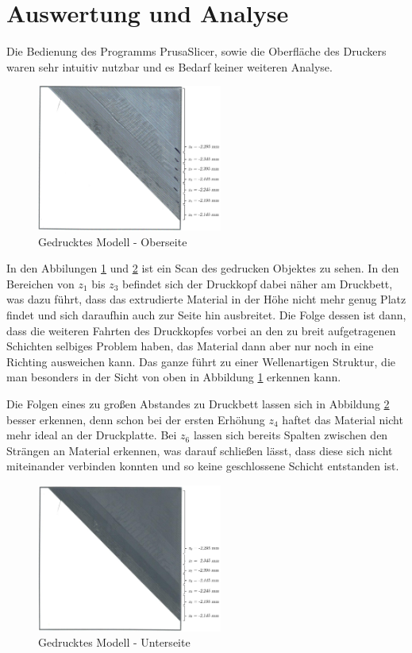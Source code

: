\documentclass[a4paper,12pt,bibtotocnumbered]{scrartcl}
\numberwithin{equation}{section} %
\begin{document}
\section[Auswertung und Analyse]{Auswertung und Analyse}

Die Bedienung des Programms PrusaSlicer, sowie die Oberfläche des Druckers waren sehr intuitiv nutzbar und es Bedarf keiner weiteren Analyse.


\begin{figure}[htbp]
\centerline{\includegraphics[width=230px]{./images/front.png}}
\caption{Gedrucktes Modell - Oberseite}
\label{front}
\end{figure}

In den Abbilungen \ref*{front} und \ref*{back} ist ein Scan des gedrucken Objektes zu sehen. In den Bereichen von $z_1$ bis $z_3$ befindet sich der Druckkopf dabei näher am Druckbett, was dazu führt, dass das extrudierte Material in der Höhe nicht mehr genug Platz findet und sich daraufhin auch zur Seite hin ausbreitet. Die Folge dessen ist dann, dass die weiteren Fahrten des Druckkopfes vorbei an den zu breit aufgetragenen Schichten selbiges Problem haben, das Material dann aber nur noch in eine Richting ausweichen kann. Das ganze führt zu einer Wellenartigen Struktur, die man besonders in der Sicht von oben in Abbildung \ref*{front} erkennen kann.

Die Folgen eines zu großen Abstandes zu Druckbett lassen sich in Abbildung \ref*{back} besser erkennen, denn schon bei der ersten Erhöhung $z_4$ haftet das Material nicht mehr ideal an der Druckplatte. Bei $z_6$ lassen sich bereits Spalten zwischen den Strängen an Material erkennen, was darauf schließen lässt, dass diese sich nicht miteinander verbinden konnten und so keine geschlossene Schicht entstanden ist. 
\begin{figure}[htbp]
\centerline{\includegraphics[width=230px]{./images/back.png}}
\caption{Gedrucktes Modell - Unterseite}
\label{back}
\end{figure}
\end{document}
